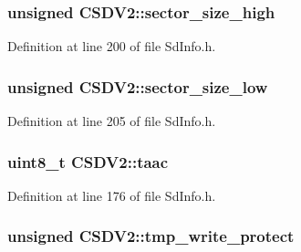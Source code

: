 \subsubsection[{\texorpdfstring{sector\+\_\+size\+\_\+high}{sector\_size\_high}}]{\setlength{\rightskip}{0pt plus 5cm}unsigned C\+S\+D\+V2\+::sector\+\_\+size\+\_\+high}\hypertarget{struct_c_s_d_v2_aa8630e4c75cd434e0db43b1644b028b4}{}\label{struct_c_s_d_v2_aa8630e4c75cd434e0db43b1644b028b4}


Definition at line 200 of file Sd\+Info.\+h.

\subsubsection[{\texorpdfstring{sector\+\_\+size\+\_\+low}{sector\_size\_low}}]{\setlength{\rightskip}{0pt plus 5cm}unsigned C\+S\+D\+V2\+::sector\+\_\+size\+\_\+low}\hypertarget{struct_c_s_d_v2_a4fbf01ce65824823473004d8507a9682}{}\label{struct_c_s_d_v2_a4fbf01ce65824823473004d8507a9682}


Definition at line 205 of file Sd\+Info.\+h.

\subsubsection[{\texorpdfstring{taac}{taac}}]{\setlength{\rightskip}{0pt plus 5cm}uint8\+\_\+t C\+S\+D\+V2\+::taac}\hypertarget{struct_c_s_d_v2_a66975134ee179b2c2d93bf4ae3b522dd}{}\label{struct_c_s_d_v2_a66975134ee179b2c2d93bf4ae3b522dd}


Definition at line 176 of file Sd\+Info.\+h.

\subsubsection[{\texorpdfstring{tmp\+\_\+write\+\_\+protect}{tmp\_write\_protect}}]{\setlength{\rightskip}{0pt plus 5cm}unsigned C\+S\+D\+V2\+::tmp\+\_\+write\+\_\+protect}\hypertarget{struct_c_s_d_v2_a15af35048d759ff86290222b7ce8e217}{}\label{struct_c_s_d_v2_a15af35048d759ff86290222b7ce8e217}



